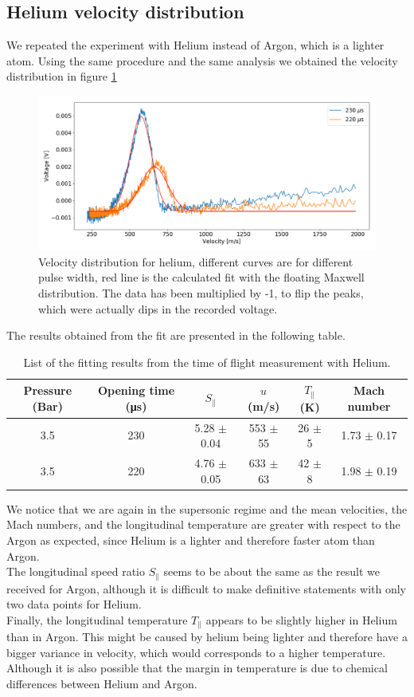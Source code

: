\documentclass[a4paper,10pt]{article}
\begin{document}
\subsection{Helium velocity distribution}
We repeated the experiment with Helium instead of Argon, which is a lighter atom. Using the same procedure and the same analysis we obtained the velocity distribution in figure \ref{heliumtof}
\begin{figure}[H]
\centering
\includegraphics[width= \textwidth]{heliumtof}
\caption{Velocity distribution for helium, different curves are for different pulse width, red line is the calculated fit with the floating Maxwell distribution. The data has been multiplied by -1, to flip the peaks, which were actually dips in the recorded voltage.}\label{heliumtof}
\end{figure}
The results obtained from the fit are presented in the following table. 
\begin{table}[H]
\begin{center}
\begin{tabular}{cccccc} \toprule
Pressure (Bar) & Opening time (\si{\micro \s}) & $S_\parallel$ & $u$ (m/s) & $T_\parallel$ (K) & Mach number \\ \midrule
3.5 & 230 & 5.28 $\pm$ 0.04 & 553 $\pm$ 55 & 26 $\pm$ 5 & 1.73 $\pm$ 0.17 \\
3.5 & 220 & 4.76 $\pm$ 0.05 & 633 $\pm$ 63 & 42 $\pm$ 8 & 1.98 $\pm$ 0.19 \\\bottomrule
\end{tabular}
\caption{List of the fitting results from the time of flight measurement with Helium.}
\end{center}
\end{table}
We notice that we are again in the supersonic regime and the mean velocities, the Mach numbers, and the longitudinal temperature are greater with respect to the Argon as expected, since Helium is a lighter and therefore faster atom than Argon. \\
The longitudinal speed ratio $S_\parallel$ seems to be about the same as the result we received for Argon, although it is difficult to make definitive statements with only two data points for Helium. \\
Finally, the longitudinal temperature $T_\parallel$ appears to be slightly higher in Helium than in Argon. This might be caused by helium being lighter and therefore have a bigger variance in velocity, which would corresponds to a higher temperature. Although it is also possible that the margin in temperature is due to chemical differences between Helium and Argon. 
\end{document}
